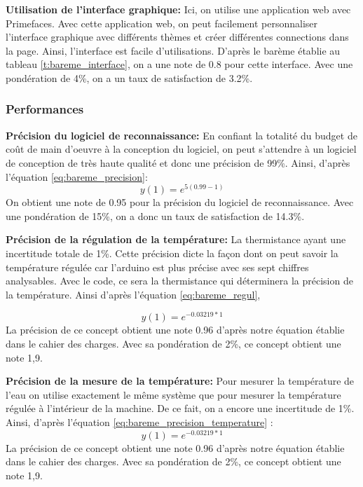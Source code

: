 \textbf{Utilisation de l'interface graphique:}
Ici, on utilise une application web avec Primefaces. Avec cette application web, on peut facilement personnaliser l'interface graphique avec différents thèmes et créer différentes connections dans la page. Ainsi, l'interface est facile d'utilisations. D'après le barème établie au tableau \ref{t:bareme_interface}, on a une note de 0.8 pour cette interface. Avec une pondération de 4\%, on a un taux de satisfaction de 3.2\%.



\subsubsection{Performances}

\textbf{Précision du logiciel de reconnaissance:}
En confiant la totalité du budget de coût de main d'oeuvre à la conception du logiciel, on peut s'attendre à un logiciel de conception de très haute qualité et donc une précision de 99\%. Ainsi, d'après l'équation \ref{eq:bareme_precision}:
\begin{equation}
    y(1) = e^{5(0.99-1)}
\end{equation}
On obtient une note de 0.95 pour la précision du logiciel de reconnaissance. Avec une pondération de 15\%, on a donc un taux de satisfaction de 14.3\%.
\vspace{5mm}


\textbf{Précision de la régulation de la température:}
La thermistance ayant une incertitude totale de 1\%. Cette précision dicte la façon dont on peut savoir la température régulée car l'arduino est plus précise avec ses sept chiffres analysables. Avec le code, ce sera la thermistance qui déterminera la précision de la température. Ainsi d'après l'équation \ref{eq:bareme_regul}, 

\begin{equation}
    y(1) = e^{-0.03219*1}
\end{equation}
La précision de ce concept obtient une note 0.96 d'après notre équation établie dans le cahier des charges. Avec sa pondération de 2\%, ce concept obtient une note 1,9.
\vspace{5mm}


\textbf{Précision de la mesure de la température:}
Pour mesurer la température de l'eau on utilise exactement le même système que pour mesurer la température régulée à l'intérieur de la machine. De ce fait, on a encore une incertitude de 1\%. Ainsi, d'après l'équation \ref{eq:bareme_precision_temperature} :
\begin{equation}
    y(1) = e^{-0.03219*1}
\end{equation}
La précision de ce concept obtient une note 0.96 d'après notre équation établie dans le cahier des charges. Avec sa pondération de 2\%, ce concept obtient une note 1,9.
\vspace{5mm}


